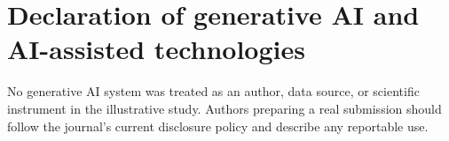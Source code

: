 \section{Declaration of generative AI and AI-assisted technologies}
No generative AI system was treated as an author, data source, or scientific
instrument in the illustrative study. Authors preparing a real submission should
follow the journal's current disclosure policy and describe any reportable use.

\clearpage
